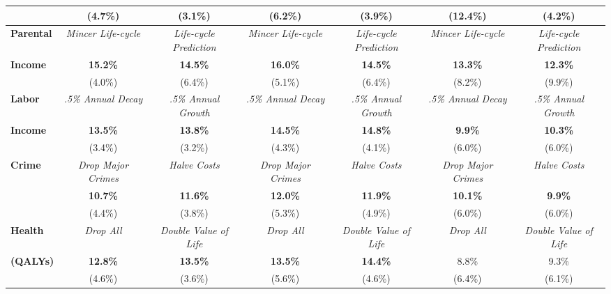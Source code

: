 \begin{tabular}{>{\bfseries}lcc|cc|cc}
	&	(4.7\%)	&	(3.1\%)	&	(6.2\%)	&	(3.9\%)	&	(12.4\%)	&	(4.2\%)	\\ \midrule
Parental	&	\textit{Mincer Life-cycle}	&	\textit{Life-cycle Prediction}	&	\textit{Mincer Life-cycle}	&	\textit{Life-cycle Prediction}	&	\textit{Mincer Life-cycle}	&	\textit{Life-cycle Prediction}	\\
Income	&	\textbf{15.2\%}	&	\textbf{14.5\%}	&	\textbf{16.0\%}	&	\textbf{14.5\%}	&	\textbf{13.3\%}	&	\textbf{12.3\%}	\\
	&	(4.0\%)	&	(6.4\%)	&	(5.1\%)	&	(6.4\%)	&	(8.2\%)	&	(9.9\%)	\\ \midrule
Labor	&	\textit{.5\% Annual Decay}	&	\textit{.5\% Annual Growth}	&	\textit{.5\% Annual Decay}	&	\textit{.5\% Annual Growth}	&	\textit{.5\% Annual Decay}	&	\textit{.5\% Annual Growth}	\\
Income	&	\textbf{13.5\%}	&	\textbf{13.8\%}	&	\textbf{14.5\%}	&	\textbf{14.8\%}	&	\textbf{9.9\%}	&	\textbf{10.3\%}	\\
	&	(3.4\%)	&	(3.2\%)	&	(4.3\%)	&	(4.1\%)	&	(6.0\%)	&	(6.0\%)	\\ \midrule
Crime	&	\textit{Drop Major Crimes}	&	\textit{Halve Costs}	&	\textit{Drop Major Crimes}	&	\textit{Halve Costs}	&	\textit{Drop Major Crimes}	&	\textit{Halve Costs}	\\
	&	\textbf{10.7\%}	&	\textbf{11.6\%}	&	\textbf{12.0\%}	&	\textbf{11.9\%}	&	\textbf{10.1\%}	&	\textbf{9.9\%}	\\
	&	(4.4\%)	&	(3.8\%)	&	(5.3\%)	&	(4.9\%)	&	(6.0\%)	&	(6.0\%)	\\ \midrule
Health	&	\textit{Drop All}	&	\textit{Double Value of Life}	&	\textit{Drop All}	&	\textit{Double Value of Life}	&	\textit{Drop All}	&	\textit{Double Value of Life}	\\
(QALYs)	&	\textbf{12.8\%}	&	\textbf{13.5\%}	&	\textbf{13.5\%}	&	\textbf{14.4\%}	&	8.8\%	&	9.3\%	\\
	&	(4.6\%)	&	(3.6\%)	&	(5.6\%)	&	(4.6\%)	&	(6.4\%)	&	(6.1\%)	\\ \bottomrule
\end{tabular} 
